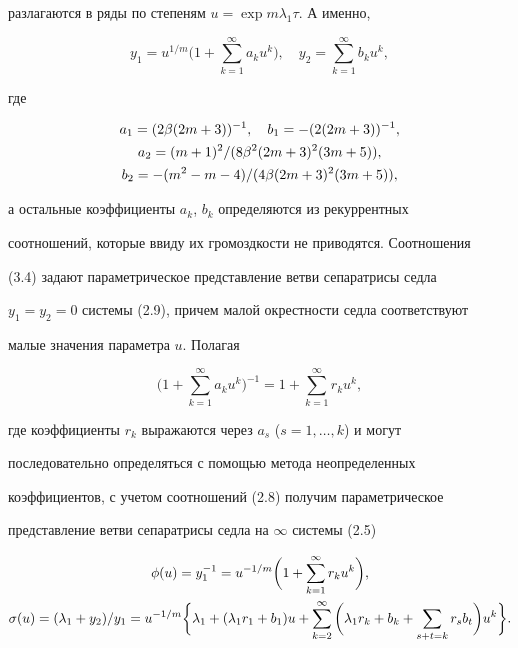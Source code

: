 разлагаются в ряды по степеням $u=\exp m\lambda_1\tau$. А именно, 


\begin{equation} 


y_1=u^{1/m}\bigg(1+\sum^\infty_{k=1}a_k u^k \bigg),\quad 


y_2=\sum^\infty_{k=1}b_k u^k, 


\end{equation} 


где 


\begin{gather} 


a_1=(2\beta(2m+3))^{-1},\quad b_1=-(2(2m+3))^{-1},\\ 


a_2=(m+1)^2/(8\beta^2(2m+3)^2(3m+5)),\notag\\ 


b_2=-(m^2-m-4)/(4\beta(2m+3)^2(3m+5)),\notag 


\end{gather} 


а остальные коэффициенты $a_k$, $b_k$ определяются из рекуррентных 


соотношений, которые ввиду их громоздкости не приводятся. Соотношения 


(3.4) задают параметрическое представление ветви сепаратрисы седла 


$y_1=y_2=0$ системы (2.9), причем малой окрестности седла соответствуют 


малые значения параметра $u$. Полагая 


$$ 


\bigg(1+\sum^\infty_{k=1}a_k u^k \bigg)^{-1}=1+ 


\sum^\infty_{k=1}r_k u^k, 


$$ 


где коэффициенты $r_k$ выражаются через $a_s$ ($s=1,\dotsc,k$) и могут 


последовательно определяться с помощью метода неопределенных 


коэффициентов, с учетом соотношений (2.8) получим параметрическое 


представление ветви сепаратрисы седла на $\infty$ системы (2.5) 


\begin{gather} 


\phi(u)=y^{-1}_1=u^{-1/m}\bigg(1+\sum^\infty_{k=1} 


r_k u^k \bigg),\\ 


\sigma(u)=(\lambda_1+y_2)/y_1=u^{-1/m}\bigg\{\lambda_1+ 


(\lambda_1r_1+b_1)u+\sum^\infty_{k=2}\bigg( 


\lambda_1r_k+b_k+\sum_{s+t=k}r_s b_t\bigg)u^k\bigg\}.\notag 


\end{gather} 


